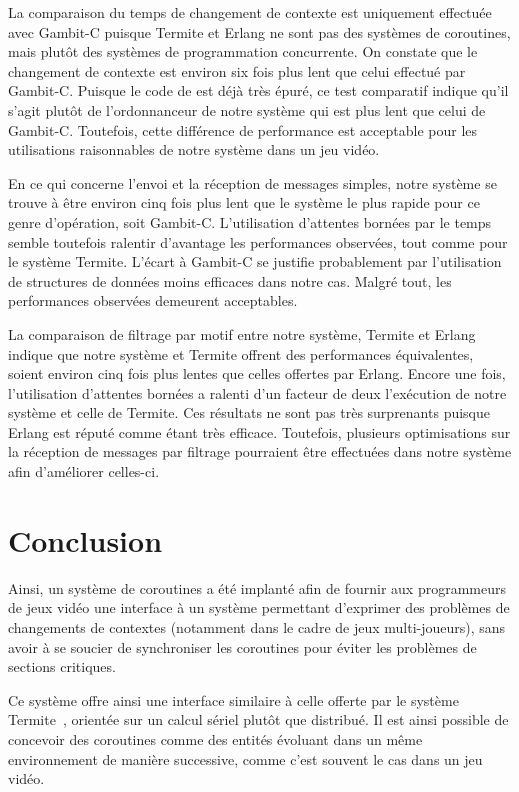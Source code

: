\documentclass[12pt,twoside,letterpaper,francais]{book}
\newcommand{\scheme}[1]{\selectlanguage{english}{\tt #1}\selectlanguage{french}}
\begin{document}
La comparaison du temps de changement de contexte est uniquement
effectuée avec Gambit-C puisque Termite et Erlang ne sont pas des
systèmes de coroutines, mais plutôt des systèmes de programmation
concurrente. On constate que le changement de contexte est environ six
fois plus lent que celui effectué par Gambit-C. Puisque le code de
\scheme{yield} est déjà très épuré, ce test comparatif indique qu'il
s'agit plutôt de l'ordonnanceur de notre système qui est plus lent que
celui de Gambit-C. Toutefois, cette différence de performance est
acceptable pour les utilisations raisonnables de notre système dans un
jeu vidéo.

En ce qui concerne l'envoi et la réception de messages simples, notre
système se trouve à être environ cinq fois plus lent que le système le
plus rapide pour ce genre d'opération, soit Gambit-C. L'utilisation
d'attentes bornées par le temps semble toutefois ralentir d'avantage
les performances observées, tout comme pour le système Termite.
L'écart à Gambit-C se justifie probablement par l'utilisation de
structures de données moins efficaces dans notre cas. Malgré tout, les
performances observées demeurent acceptables.

La comparaison de filtrage par motif entre notre système, Termite et
Erlang indique que notre système et Termite offrent des performances
équivalentes, soient environ cinq fois plus lentes que celles offertes
par Erlang. Encore une fois, l'utilisation d'attentes bornées a
ralenti d'un facteur de deux l'exécution de notre système et celle de
Termite.  Ces résultats ne sont pas très surprenants puisque Erlang
est réputé comme étant très efficace. Toutefois, plusieurs
optimisations sur la réception de messages par filtrage pourraient
être effectuées dans notre système afin d'améliorer celles-ci.


\FloatBarrier
\section{Conclusion}
Ainsi, un système de coroutines a été implanté afin de fournir aux
programmeurs de jeux vidéo une interface à un système permettant
d'exprimer des problèmes de changements de contextes (notamment dans
le cadre de jeux multi-joueurs), sans avoir à se soucier de
synchroniser les coroutines pour éviter les problèmes de sections
critiques.

Ce système offre ainsi une interface similaire à celle offerte par le
système Termite~\cite{Termite_paper}, orientée sur un calcul sériel
plutôt que distribué. Il est ainsi possible de concevoir des
coroutines comme des entités évoluant dans un même environnement de
manière successive, comme c'est souvent le cas dans un jeu vidéo.
\end{document}

